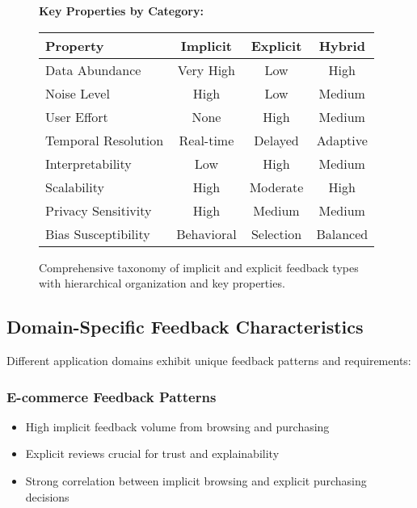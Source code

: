 \begin{figure}[!htbp]
{\begin{minipage}{0.9\textwidth}
\textbf{Key Properties by Category:}
\begin{tabular}{@{}lccc@{}}
\toprule
Property & Implicit & Explicit & Hybrid \\
\midrule
Data Abundance & Very High & Low & High \\
Noise Level & High & Low & Medium \\
User Effort & None & High & Medium \\
Temporal Resolution & Real-time & Delayed & Adaptive \\
Interpretability & Low & High & Medium \\
Scalability & High & Moderate & High \\
Privacy Sensitivity & High & Medium & Medium \\
Bias Susceptibility & Behavioral & Selection & Balanced \\
\bottomrule
\end{tabular}
\end{minipage}
}
\caption{Comprehensive taxonomy of implicit and explicit feedback types with hierarchical organization and key properties.}
\label{fig:comprehensive_taxonomy}
\end{figure}

\subsection{Domain-Specific Feedback Characteristics}

Different application domains exhibit unique feedback patterns and requirements:

\subsubsection{E-commerce Feedback Patterns}
\begin{itemize}
    \item High implicit feedback volume from browsing and purchasing
    \item Explicit reviews crucial for trust and explainability
    \item Strong correlation between implicit browsing and explicit purchasing decisions
\end{itemize}

